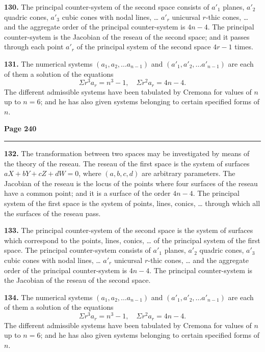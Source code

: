 \documentclass[12pt,a4paper]{article}
\theoremstyle{plain}
\theoremstyle{definition}
\theoremstyle{remark}
\begin{document}
\textbf{130.} The principal counter-system of the second space consists of $a'_1$ planes, $a'_2$ quadric cones, $a'_3$ cubic cones with nodal lines, \ldots{} $a'_r$ unicursal $r$-thic cones, \ldots{} and the aggregate order of the principal counter-system is $4n - 4$. The principal counter-system is the Jacobian of the reseau of the second space; and it passes through each point $a'_r$ of the principal system of the second space $4r - 1$ times.

\textbf{131.} The numerical systems $(a_1, a_2, \ldots a_{n-1})$ and $(a'_1, a'_2, \ldots a'_{n-1})$ are each of them a solution of the equations
\[
\Sigma r^3 a_r = n^3 - 1, \quad \Sigma r^2 a_r = 4n - 4.
\]
The different admissible systems have been tabulated by Cremona for values of $n$ up to $n = 6$; and he has also given systems belonging to certain specified forms of $n$.

\newpage
\noindent\textbf{Page 240}\\
\noindent\rule{\textwidth}{0.4pt}

\smallskip

\noindent\textbf{132.} The transformation between two spaces may be investigated by means of the theory of the reseau. The reseau of the first space is the system of surfaces $aX + bY + cZ + dW = 0$, where $(a, b, c, d)$ are arbitrary parameters. The Jacobian of the reseau is the locus of the points where four surfaces of the reseau have a common point; and it is a surface of the order $4n - 4$. The principal system of the first space is the system of points, lines, conics, \ldots{} through which all the surfaces of the reseau pass.

\textbf{133.} The principal counter-system of the second space is the system of surfaces which correspond to the points, lines, conics, \ldots{} of the principal system of the first space. The principal counter-system consists of $a'_1$ planes, $a'_2$ quadric cones, $a'_3$ cubic cones with nodal lines, \ldots{} $a'_r$ unicursal $r$-thic cones, \ldots{} and the aggregate order of the principal counter-system is $4n - 4$. The principal counter-system is the Jacobian of the reseau of the second space.

\textbf{134.} The numerical systems $(a_1, a_2, \ldots a_{n-1})$ and $(a'_1, a'_2, \ldots a'_{n-1})$ are each of them a solution of the equations
\[
\Sigma r^3 a_r = n^3 - 1, \quad \Sigma r^2 a_r = 4n - 4.
\]
The different admissible systems have been tabulated by Cremona for values of $n$ up to $n = 6$; and he has also given systems belonging to certain specified forms of $n$.
\end{document}
